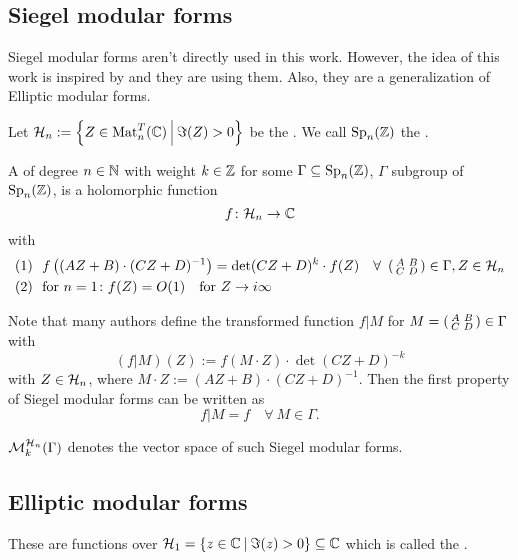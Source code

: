 \subsection{Siegel modular forms}

Siegel modular forms aren't directly used in this work. However, the idea of this work is inspired by \cite{PoorYuen07Comp} and they are using them. Also, they are a generalization of Elliptic modular forms.

Let $\SiegelHalfPlane_n := \Set{Z \in \M_n^T(\C)}{\Im(Z) > 0}$ be the .
We call $\operatorname{Sp}_n(\mathbb{Z})$ the .


A  of degree $n\in\mathbb{N}$ with weight $k \in \mathbb{Z}$ for some $\Gamma \subseteq \operatorname{Sp}_n(\mathbb{Z})$, $\Gamma$ subgroup of $\operatorname{Sp}_n(\mathbb{Z})$, is a holomorphic function
\[ f \colon \mathcal{H}_n \rightarrow \mathbb{C} \]
with
\begin{align*}
(1) \ \ & f\left((AZ + B)\cdot(CZ + D)^{-1}\right) = \det(CZ + D)^k \cdot f(Z) \quad \forall \ \left( \begin{smallmatrix} A & B \\ C & D \end{smallmatrix} \right) \in \Gamma, Z \in \mathcal{H}_n \\
(2) \ \ & \text{for } n = 1 \colon f(Z) = O(1) \quad \text{for } Z \rightarrow i \infty
\end{align*}

Note that many authors define the transformed function $f | M$ for $M = \left( \begin{smallmatrix} A & B \\ C & D \end{smallmatrix} \right) \in \Gamma$ with  
\[ \left( f | M \right) (Z) :=
f(M \cdot Z) \cdot \det(CZ + D)^{-k} \]
with $Z \in \mathcal{H}_n$, where $M \cdot Z := (A Z + B) \cdot (C Z + D)^{-1}$. Then the first property of Siegel modular forms can be written as
\[ f | M = f \quad \forall\ M \in \Gamma . \]

$\operatorname{\mathcal{M}}^{\mathcal{H}_{n}}_k (\Gamma)$ denotes the vector space of such Siegel modular forms.

\subsection{Elliptic modular forms}
These are functions over $\SiegelHalfPlane_1 = \Set{z \in \C}{\Im(z) > 0} \subseteq \C$ which is called the .

